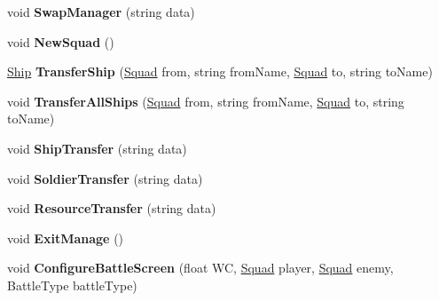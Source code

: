 \begin{DoxyCompactItemize}
\item 
\hypertarget{class_g_u_i_manager_af76a9697e77f9575b8470536541f965a}{}void {\bfseries Swap\+Manager} (string data)\label{class_g_u_i_manager_af76a9697e77f9575b8470536541f965a}

\item 
\hypertarget{class_g_u_i_manager_a694a02f2bfcb731765c4fc2ad3b6fcf7}{}void {\bfseries New\+Squad} ()\label{class_g_u_i_manager_a694a02f2bfcb731765c4fc2ad3b6fcf7}

\item 
\hypertarget{class_g_u_i_manager_a301d2fb46398db4528fd6668c52f499b}{}\hyperlink{class_ship}{Ship} {\bfseries Transfer\+Ship} (\hyperlink{class_squad}{Squad} from, string from\+Name, \hyperlink{class_squad}{Squad} to, string to\+Name)\label{class_g_u_i_manager_a301d2fb46398db4528fd6668c52f499b}

\item 
\hypertarget{class_g_u_i_manager_acb733b808a4de6b58dcd74c0f7975b23}{}void {\bfseries Transfer\+All\+Ships} (\hyperlink{class_squad}{Squad} from, string from\+Name, \hyperlink{class_squad}{Squad} to, string to\+Name)\label{class_g_u_i_manager_acb733b808a4de6b58dcd74c0f7975b23}

\item 
\hypertarget{class_g_u_i_manager_afeecd392b061ab6099a4c35928d1c331}{}void {\bfseries Ship\+Transfer} (string data)\label{class_g_u_i_manager_afeecd392b061ab6099a4c35928d1c331}

\item 
\hypertarget{class_g_u_i_manager_ae85086d2cdb9cd55078caf826346a4f4}{}void {\bfseries Soldier\+Transfer} (string data)\label{class_g_u_i_manager_ae85086d2cdb9cd55078caf826346a4f4}

\item 
\hypertarget{class_g_u_i_manager_a343c19fbde0ffa292af80d9c40e7b3cf}{}void {\bfseries Resource\+Transfer} (string data)\label{class_g_u_i_manager_a343c19fbde0ffa292af80d9c40e7b3cf}

\item 
\hypertarget{class_g_u_i_manager_a93fb8a732bd551f575ef654924334b52}{}void {\bfseries Exit\+Manage} ()\label{class_g_u_i_manager_a93fb8a732bd551f575ef654924334b52}

\item 
\hypertarget{class_g_u_i_manager_aca3f5793a2f439aeff00fff68078675f}{}void {\bfseries Configure\+Battle\+Screen} (float W\+C, \hyperlink{class_squad}{Squad} player, \hyperlink{class_squad}{Squad} enemy, Battle\+Type battle\+Type)\label{class_g_u_i_manager_aca3f5793a2f439aeff00fff68078675f}


\end{DoxyCompactItemize}

